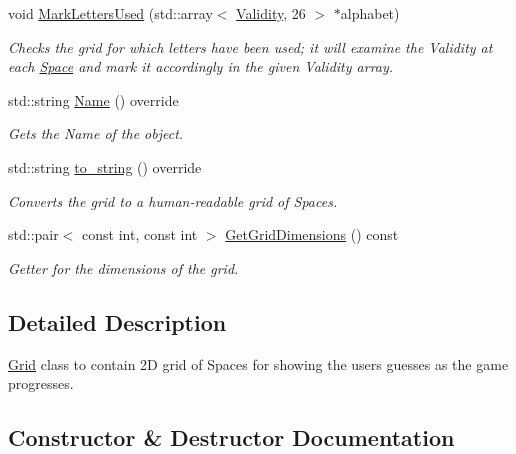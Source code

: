\begin{DoxyCompactItemize}
void \hyperlink{classgame_1_1objects_1_1Grid_aba01074c988b3732d7de432c5dd558ac}{Mark\+Letters\+Used} (std\+::array$<$ \hyperlink{Validity_8h_acb8ce664e8a953fe8c27d7f0b37cbca4}{Validity}, 26 $>$ $\ast$alphabet)
\begin{DoxyCompactList}\small\item\em Checks the grid for which letters have been used; it will examine the Validity at each \hyperlink{classgame_1_1objects_1_1Space}{Space} and mark it accordingly in the given Validity array. \end{DoxyCompactList}\item 
std\+::string \hyperlink{classgame_1_1objects_1_1Grid_a1a10441dea475af11c796995af6e9855}{Name} () override
\begin{DoxyCompactList}\small\item\em Gets the Name of the object. \end{DoxyCompactList}\item 
std\+::string \hyperlink{classgame_1_1objects_1_1Grid_a3ecc419e20319a116b0a467e064e0403}{to\+\_\+string} () override
\begin{DoxyCompactList}\small\item\em Converts the grid to a human-\/readable grid of Spaces. \end{DoxyCompactList}\item 
std\+::pair$<$ const int, const int $>$ \hyperlink{classgame_1_1objects_1_1Grid_a16bf69070bed5732b1a42a97b83ea2cb}{Get\+Grid\+Dimensions} () const
\begin{DoxyCompactList}\small\item\em Getter for the dimensions of the grid. \end{DoxyCompactList}\end{DoxyCompactItemize}


\subsection{Detailed Description}
\hyperlink{classgame_1_1objects_1_1Grid}{Grid} class to contain 2D grid of Spaces for showing the user\textquotesingle{}s guesses as the game progresses. 

\subsection{Constructor \& Destructor Documentation}
\mbox{\label{classgame_1_1objects_1_1Grid_a8ccdcfad249ef402977c9a9582ef02f7}} 

